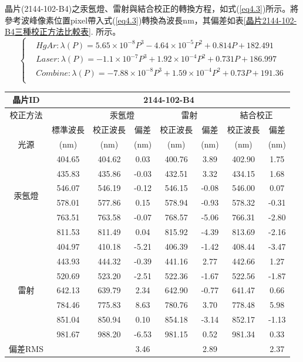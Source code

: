 \newpage
晶片(2144-102-B4)之汞氬燈、雷射與結合校正的轉換方程，如式(\ref{eq4.3})所示。將參考波峰像素位置pixel帶入式(\ref{eq4.3})轉換為波長nm，其偏差如表\ref{晶片2144-102-B4三種校正方法比較表}. 所示。
\begin{equation}\label{eq4.3}
	\begin{cases}		
		& Hg Ar: \lambda(P) = 5.65\times 10^{-8}P^3 -4.64\times 10^{-5}P^2+0.814P+182.491\\
		& Laser: \lambda(P) = -1.1\times 10^{-7}P^3 + 1.92\times 10^{-4}P^2+0.731P+186.997\\
		& Combine: \lambda(P) = -7.88\times 10^{-8}P^3 + 1.59\times 10^{-4}P^2+0.73P+191.36\\
	\end{cases}
\end{equation}
\begin{center}
	\vspace{0.5cm}
	\label{晶片2144-102-B4三種校正方法比較表}
\begin{tabularx}{\textwidth}{cccccccc}
	\hline\hline
	晶片ID&\multicolumn{7}{c}{2144-102-B4}\\
	\hline
	校正方法&&\multicolumn{2}{c}{汞氬燈}&\multicolumn{2}{c}{雷射}&\multicolumn{2}{c}{結合校正}\\
	\hline
	    &標準波長&校正波長&偏差&校正波長&偏差&校正波長&偏差\\
	光源&(nm)   &(nm)    &(nm)&(nm)   &(nm)&(nm)   &(nm)\\
	\hline
	\multirow{6}{*}{汞氬燈}
&404.65&	404.62&	0.03	&400.76	&3.89	&402.90	&1.75\\
&435.83&	435.86&	-0.03	&432.51	&3.32	&434.15	&1.68\\
&546.07&	546.19&	-0.12	&546.15	&-0.08	&546.00	&0.07\\
&578.01&	577.86&	0.15	&578.94	&-0.93	&578.32	&-0.31\\
&763.51&	763.58&	-0.07	&768.57	&-5.06	&766.31	&-2.80\\
&811.53&	811.49&	0.04	&815.92	&-4.39	&813.69	&-2.16\\
\hline
\multirow{7}{*}{雷射}
&404.97&	410.18&	-5.21	&406.39	&-1.42	&408.44	&-3.47\\
&443.93&	444.32&	-0.39	&441.16	&2.77	&442.66	&1.27\\
&520.69&	523.20&	-2.51	&522.36	&-1.67	&522.56	&-1.87\\
&642.13&	639.79&	2.34	&642.90	&-0.77	&641.47	&0.66\\
&784.46&	775.83&	8.63	&780.76	&3.70	&778.48	&5.98\\
&851.04&	850.94&	0.10	&854.18	&-3.14	&852.17	&-1.13\\
&981.67&	988.20&	-6.53	&981.15	&0.52	&981.34	&0.33\\
	\hline
	偏差RMS& & &3.46& &2.89& &2.37\\
	\hline\hline
\end{tabularx}
\vspace{10pt}
\end{center}

